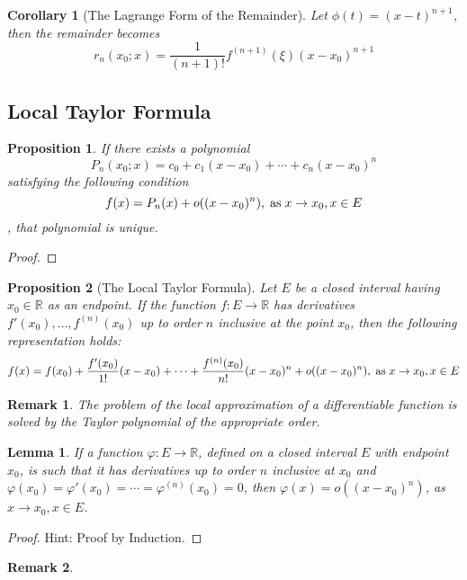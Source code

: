 \documentclass[onecolumn]{ctexart}
\newtheorem{proposition}{Proposition}
\newtheorem{lemma}{Lemma}
\newtheorem{corollary}{Corollary}
\newtheorem{remark}{Remark}
\begin{document}
\begin{corollary}[The Lagrange Form of the Remainder]
  Let $\phi(t) = (x - t)^{n+1}$, then the remainder becomes
  \begin{equation}
    r_n(x_0; x) = \frac{1}{(n+1)!}f^{(n+1)}(\xi)(x - x_0)^{n+1}
  \end{equation}
\end{corollary}

\subsection{Local Taylor Formula}

\begin{proposition}
  If there exists a polynomial
  \[
    P_n(x_0;x) = c_0 + c_1(x - x_0) + \cdots + c_n(x - x_0)^n 
  \]
  satisfying the following condition
  \[
    f(x) = P_n(x) + o((x - x_0)^n), \thickspace \textnormal{as} \thickspace x \to x_0, x \in E
  \],
  that polynomial is unique.
\end{proposition}
\begin{proof}
  
\end{proof}

\begin{proposition}[The Local Taylor Formula]
  Let $E$ be a closed interval having $x_0 \in \mathbb{R}$ as an endpoint. If 
  the function $f: E \to \mathbb{R}$ has derivatives $f'(x_0), \ldots, 
  f^{(n)}(x_0)$ up to order $n$ inclusive at the point $x_0$, then the following 
  representation holds:
  \begin{equation}
    f(x) = f(x_0) + \frac{f'(x_0)}{1!}(x - x_0) + \cdots + \frac{f^{(n)}(x_0)}{n!}(x - x_0)^n + o((x - x_0)^n), \thickspace \textnormal{as} \thickspace x \to x_0, x \in E
  \end{equation}
\end{proposition}
\begin{remark}
  The problem of the local approximation of a differentiable function is solved 
  by the Taylor polynomial of the appropriate order.
\end{remark}

\begin{lemma}
  If a function $\varphi: E \to \mathbb{R}$, defined on a closed interval $E$ 
  with endpoint $x_0$, is such that it has derivatives up to order $n$ inclusive 
  at $x_0$ and $\varphi(x_0) = \varphi'(x_0) = \cdots = \varphi^{(n)}(x_0) = 0$, 
  then $\varphi(x) = o((x - x_0)^n)$, as $x \to x_0, x \in E$.
\end{lemma}
\begin{proof}
  Hint: Proof by Induction.
\end{proof}
\begin{remark}
  
\end{remark}
\end{document}
